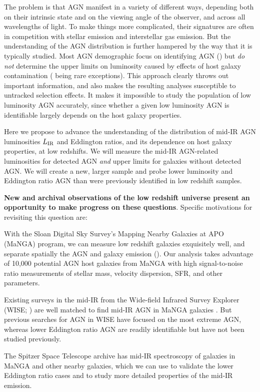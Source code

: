 \documentclass[12pt, preprint]{hacked-aastex}
\newlength{\mylen}
\newenvironment{ditemize}
{ \begin{list}{}{%
\setlength{\topsep}{0pt}%
\setlength{\partopsep}{3pt}%
\setlength{\itemsep}{1pt}\setlength{\parsep}{1pt}%
\setlength{\itemindent}{0pt}\setlength{\listparindent}{12pt}%
\setlength{\leftmargin}{24pt}\setlength{\rightmargin}{0in}%
\setlength{\labelsep}{3pt}\setlength{\labelwidth}{6pt}%
\setlength{\mylen}{3pt}
\renewcommand{\makelabel}{\makebox[\labelwidth][l]{\raisebox{\mylen}{\tiny$\bullet$}\hspace{\fill}}}}}
{\end{list}}
\begin{document}
The problem is that AGN manifest in a variety of different ways,
depending both on their intrinsic state and on the viewing angle of
the observer, and across all wavelengths of light.  To make things
more complicated, their signatures are often in competition with
stellar emission and interstellar gas emission.  But the understanding
of the AGN distribution is further hampered by the way that it is
typically studied. Most AGN demographic focus on identifying AGN
(\cite{kauffmann03b, lacy15a, sanchez18a, comerford20a, greene20a})
but {\it do not} determine the upper limits on luminosity caused by
effects of host galaxy contamination (\cite{trump15a, jones17a} being
rare exceptions). This approach clearly throws out important
information, and also makes the resulting analyses susceptible to
untracked selection effects. It makes it impossible to study the
population of low luminosity AGN accurately, since whether a given low
luminosity AGN is identifiable largely depends on the host galaxy
properties.

Here we propose to advance the understanding of the distribution of
mid-IR AGN luminosities $L_{\rm IR}$ and Eddington ratios, and its
dependence on host galaxy properties, at low redshifts.  We will
measure the mid-IR AGN-related luminosities for detected AGN {\it and}
upper limits for galaxies without detected AGN. We will create a new,
larger sample and probe lower luminosity and Eddington ratio AGN than
were previously identified in low redshift samples.

{\bf New and archival observations of the low redshift universe
  present an opportunity to make progress on these
  questions}. Specific motivations for revisiting this question are:
\begin{ditemize}
\item With the Sloan Digital Sky Survey's Mapping Nearby Galaxies at
  APO (MaNGA) program, we can measure low redshift galaxies
  exquisitely well, and separate spatially the AGN and galaxy emission
  (\cite{bundy15a, blanton17a}).  Our analysis takes advantage of
  10,000 potential AGN host galaxies from MaNGA with high
  signal-to-noise ratio measurements of stellar mass, velocity
  dispersion, SFR, and other parameters.
\item Existing surveys in the mid-IR from the Wide-field Infrared
  Survey Explorer (WISE; \cite{wright10a}) are well matched to find
  mid-IR AGN in MaNGA galaxies \cite{comerford20a}. But previous
  searches for AGN in WISE have focused on the most extreme AGN,
  whereas lower Eddington ratio AGN are readily identifiable but have
  not been studied previously.
\item The Spitzer Space Telescope archive has mid-IR spectroscopy of
  galaxies in MaNGA and other nearby galaxies, which we can use to
  validate the lower Eddington ratio cases and to study more detailed
  properties of the mid-IR emission.
\end{ditemize}
\end{document}
